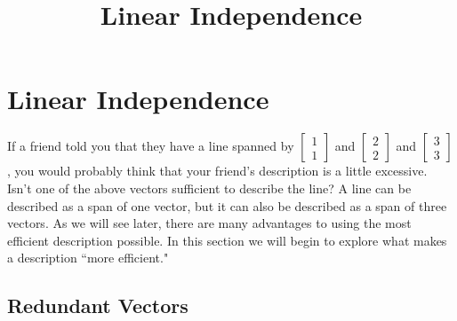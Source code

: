 \documentclass{ximera}
\title{Linear Independence} \license{CC BY-NC-SA 4.0}
\begin{document}
\begin{abstract}
 \end{abstract}
\maketitle

\section*{Linear Independence}
If a friend told you that they have a line spanned by $\begin{bmatrix}1\\1\end{bmatrix}$ and $\begin{bmatrix}2\\2\end{bmatrix}$ and $\begin{bmatrix}3\\3\end{bmatrix}$, you would probably think that your friend's description is a little excessive.  Isn't one of the above vectors sufficient to describe the line?  A line can be described as a span of one vector, but it can also be described as a span of three vectors.  As we will see later, there are many advantages to using the most efficient description possible.  In this section we will begin to explore what makes a description ``more efficient."
\subsection*{Redundant Vectors}
\end{document}
